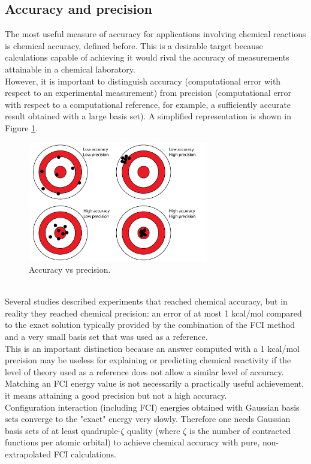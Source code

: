 \subsection{Accuracy and precision}
The most useful measure of accuracy for applications involving chemical reactions is chemical accuracy, defined before. This is a desirable target because calculations capable of achieving it would rival the accuracy of measurements attainable in a chemical laboratory. \\
However, it is important to distinguish accuracy (computational error with respect to an experimental measurement) from precision (computational error with respect to a computational reference, for example, a sufficiently accurate result obtained with a large basis set). A simplified representation is shown in Figure \ref{Accuracy vs precision}.
\begin{figure}[ht]
\centering
\includegraphics[width=0.7\textwidth]{figures/Accuracy vs precision.jpg}
\caption{Accuracy vs precision.} \label{Accuracy vs precision}
\end{figure} \\
Several studies described experiments that reached chemical accuracy, but in reality they reached chemical precision: an error of at most 1 kcal/mol compared to the exact solution typically provided by the combination of the FCI method and a very small basis set that was used as a reference. \\
This is an important distinction because an answer computed with a 1 kcal/mol precision may be useless for explaining or predicting chemical reactivity if the level of theory used as a reference does not allow a similar level of accuracy. Matching an FCI energy value is not necessarily a practically useful achievement, it means attaining a good precision but not a high accuracy. \\
Configuration interaction (including FCI) energies obtained with Gaussian basis sets converge to the "exact" energy very slowly. Therefore one needs Gaussian basis sets of at least quadruple-$\zeta$ quality (where $\zeta$ is the number of contracted functions per atomic orbital) to achieve chemical accuracy with pure, non-extrapolated FCI calculations.

